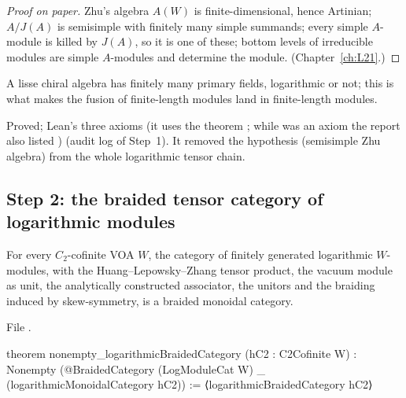 \begin{proof}[Proof on paper]
Zhu's algebra $A(W)$ is finite-dimensional, hence Artinian; $A/J(A)$ is semisimple with finitely many simple summands;
every simple $A$-module is killed by $J(A)$, so it is one of these; bottom levels of irreducible modules are simple
$A$-modules and determine the module. (Chapter~\ref{ch:L21}.)
\end{proof}

\begin{physics}
A lisse chiral algebra has finitely many primary fields, logarithmic or not; this is what makes the fusion of
finite-length modules land in finite-length modules.
\end{physics}

\begin{status}
Proved; Lean's three axioms (it uses the theorem ; while  was an axiom the report also listed ) (audit log of Step~1). It removed the hypothesis  (semisimple Zhu
algebra) from the whole logarithmic tensor chain.
\end{status}

\subsection{Step 2: the braided tensor category of logarithmic modules}

\begin{theorem}\label{l22:thm:O2}
For every $C_2$-cofinite VOA $W$, the category of finitely generated logarithmic $W$-modules, with the
Huang--Lepowsky--Zhang tensor product, the vacuum module as unit, the analytically constructed associator, the unitors
and the braiding induced by skew-symmetry, is a braided monoidal category.
\end{theorem}
\noindent File .
\begin{leancode}
theorem nonempty_logarithmicBraidedCategory (hC2 : C2Cofinite W) :
    Nonempty (@BraidedCategory (LogModuleCat W) _ (logarithmicMonoidalCategory hC2)) :=
  ⟨logarithmicBraidedCategory hC2⟩
\end{leancode}

